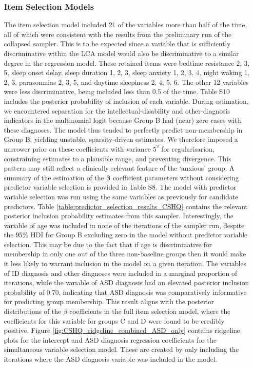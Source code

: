 \documentclass[11pt]{article}
\def\bsbet{\boldsymbol{\beta}}
\theoremstyle{plain}
\theoremstyle{definition}
\begin{document}
\subsubsection{Item Selection Models}\label{subsec:CSHQ_item_sel}
The item selection model included 21 of the variables more than half of the time, all of which were consistent with the results from the preliminary run of the collapsed sampler. This is to be expected since a variable that is sufficiently discriminative within the LCA model would also be discriminative to a similar degree in the regression model. These retained items were bedtime resistance 2, 3, 5, sleep onset delay, sleep duration 1, 2, 3, sleep anxiety 1, 2, 3, 4, night waking 1, 2, 3, parasomnias 2, 3, 5, and daytime sleepiness 2, 4, 5, 6. The other 12 variables were less discriminative, being included less than 0.5 of the time. Table S10 includes the posterior probability of inclusion of each variable. 
During estimation, we encountered separation for the intellectual-disability and other-diagnosis indicators in the multinomial logit because Group B had (near) zero cases with these diagnoses. The model thus tended to perfectly predict non-membership in Group B, yielding unstable, sparsity-driven estimates. We therefore imposed a narrower prior on these coefficients with variance $5^2$ for regularisarion, constraining estimates to a plausible range, and preventing divergence. This pattern may still reflect a clinically relevant feature of the `anxious' group. A summary of the estimation of the $\bsbet$ coefficient parameters without considering predictor variable selection is provided in Table S8. 
The model with predictor variable selection was run using the same variables as previously for candidate predictors. Table \ref{table:predictor_selection_results_CSHQ} contains the relevant posterior inclusion probability estimates from this sampler. Interestingly, the variable of age was included in none of the iterations of the sampler run, despite the 95\% HDI for Group B excluding zero in the model without predictor variable selection. This may be due to the fact that if age is discriminative for membership in only one out of the three non-baseline groups then it would make it less likely to warrant inclusion in the model on a given iteration. The variables of ID diagnosis and other diagnoses were included in a marginal proportion of iterations, while the variable of ASD diagnosis had an elevated posterior inclusion probability of 0.70, indicating that ASD diagnosis was comparatively informative for predicting group membership. This result aligns with the posterior distributions of the $\beta$ coefficients in the full item selection model, where the coefficients for this variable for groups C and D were found to be credibly positive. Figure \ref{fig:CSHQ_ridgeline_combined_ASD_only} contains ridgeline plots for the intercept and ASD diagnosis regression coefficients for the simultaneous variable selection model. These are created by only including the iterations where the ASD diagnosis variable was included in the model.   
\end{document}
